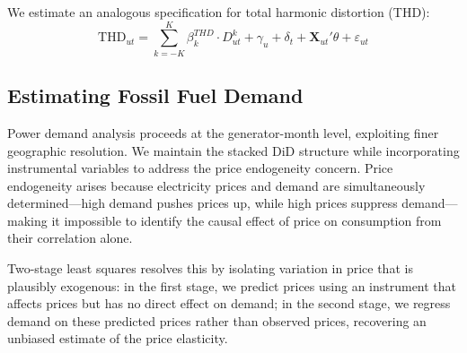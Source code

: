 \documentclass[sigconf,authordraft]{acmart}
\newcommand{\nb}[1]{\textcolor{blue}{NB[#1]}}
\begin{document}
We estimate an analogous specification for total harmonic distortion (THD):
\begin{equation}
\text{THD}_{ut} = \sum_{k=-K}^{K} \beta_k^{THD} \cdot D_{ut}^k + \gamma_u + \delta_t + \mathbf{X}_{ut}'\theta + \varepsilon_{ut}
\label{eq:thd_eventstudy}
\end{equation}


\subsection{Estimating Fossil Fuel Demand}

Power demand analysis proceeds at the generator-month level, exploiting finer geographic resolution. We maintain the stacked DiD structure while incorporating instrumental variables to address the price endogeneity concern. Price endogeneity arises because electricity prices and demand are simultaneously determined—high demand pushes prices up, while high prices suppress demand—making it impossible to identify the causal effect of price on consumption from their correlation alone.

Two-stage least squares resolves this by isolating variation in price that is plausibly exogenous: in the first stage, we predict prices using an instrument that affects prices but has no direct effect on demand; in the second stage, we regress demand on these predicted prices rather than observed prices, recovering an unbiased estimate of the price elasticity.

\end{document}
